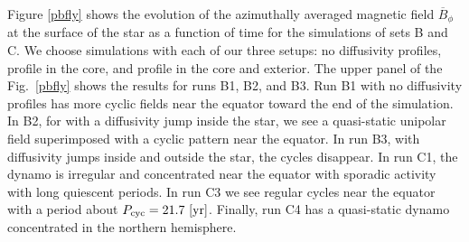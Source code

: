 \documentclass[baaa]{baaa}
\begin{document}
Figure \ref{pbfly} shows the evolution of the azimuthally averaged magnetic field $\overline{B}_{\phi}$ at the surface of the star as a function of time for the simulations of sets B and C. 
We choose simulations with each of our three setups: no diffusivity profiles, profile in the core, and profile in the core and exterior.
The upper panel of the Fig.~\ref{pbfly} shows the results for runs B1, B2, and B3.
Run B1 with no diffusivity profiles has more cyclic fields near the equator toward the end of the simulation.
In B2, for with a diffusivity jump inside the star, we see a quasi-static unipolar field superimposed with a cyclic pattern near the equator.
In run B3, with diffusivity jumps inside and outside the star, the cycles disappear. 
In run C1, the dynamo is irregular and concentrated near the equator with sporadic activity with long quiescent periods.
 In run C3 we see regular cycles near the equator with a period about $P_{\rm cyc} = 21.7 ~ \rm [yr]$. Finally, run C4 has a quasi-static dynamo concentrated in the northern hemisphere.
\end{document}
